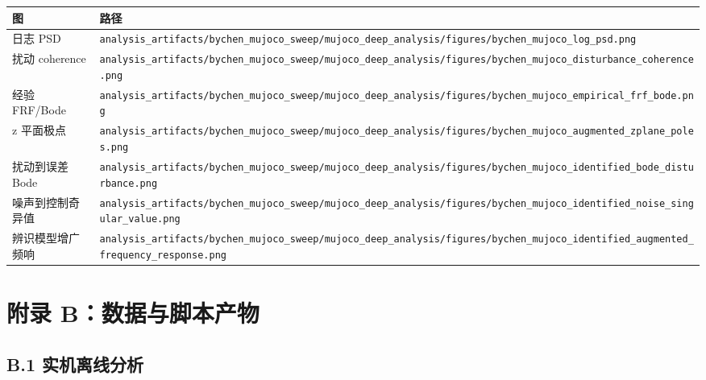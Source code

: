 \begin{longtable}[]{@{}
  >{\raggedright\arraybackslash}p{}
  >{\raggedright\arraybackslash}p{}@{}}
\toprule\noalign{}
\begin{minipage}[b]{\linewidth}\raggedright
图
\end{minipage} & \begin{minipage}[b]{\linewidth}\raggedright
路径
\end{minipage} \\
\midrule\noalign{}
\endhead
\bottomrule\noalign{}
\endlastfoot
日志 PSD & \texttt{analysis\_artifacts/bychen\_mujoco\_sweep/mujoco\_deep\_analysis/figures/bychen\_mujoco\_log\_psd.png} \\
扰动 coherence & \texttt{analysis\_artifacts/bychen\_mujoco\_sweep/mujoco\_deep\_analysis/figures/bychen\_mujoco\_disturbance\_coherence.png} \\
经验 FRF/Bode & \texttt{analysis\_artifacts/bychen\_mujoco\_sweep/mujoco\_deep\_analysis/figures/bychen\_mujoco\_empirical\_frf\_bode.png} \\
z 平面极点 & \texttt{analysis\_artifacts/bychen\_mujoco\_sweep/mujoco\_deep\_analysis/figures/bychen\_mujoco\_augmented\_zplane\_poles.png} \\
扰动到误差 Bode & \texttt{analysis\_artifacts/bychen\_mujoco\_sweep/mujoco\_deep\_analysis/figures/bychen\_mujoco\_identified\_bode\_disturbance.png} \\
噪声到控制奇异值 & \texttt{analysis\_artifacts/bychen\_mujoco\_sweep/mujoco\_deep\_analysis/figures/bychen\_mujoco\_identified\_noise\_singular\_value.png} \\
辨识模型增广频响 & \texttt{analysis\_artifacts/bychen\_mujoco\_sweep/mujoco\_deep\_analysis/figures/bychen\_mujoco\_identified\_augmented\_frequency\_response.png} \\
\end{longtable}

\section{附录 B：数据与脚本产物}\label{ux9644ux5f55-bux6570ux636eux4e0eux811aux672cux4ea7ux7269}

\subsection{B.1 实机离线分析}\label{b.1-ux5b9eux673aux79bbux7ebfux5206ux6790}

